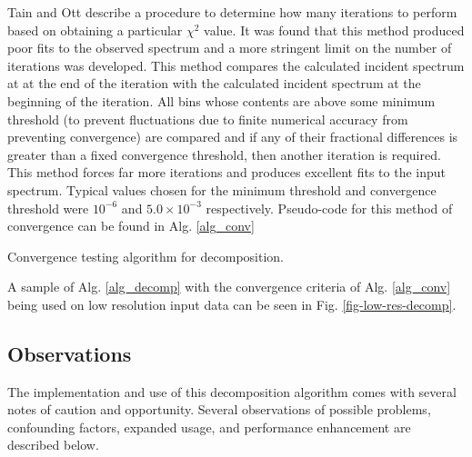 \documentclass[5p]{elsarticle}
\makeatletter
\def\BState{\State\hskip-\ALG@thistlm}
\DeclarePairedDelimiter{\abs}{\lvert}{\rvert}
\DeclarePairedDelimiter{\paren}{\lparen}{\rparen}
\makeatother
\begin{document}
Tain and Ott describe a procedure to determine how many iterations to perform based on obtaining a particular $\chi{}^2$ value. It was found that this method produced poor fits to the observed spectrum and a more stringent limit on the number of iterations was developed. This method compares the calculated incident spectrum at at the end of the iteration with the calculated incident spectrum at the beginning of the iteration. All bins whose contents are above some minimum threshold (to prevent fluctuations due to finite numerical accuracy from preventing convergence) are compared and if any of their fractional differences is greater than a fixed convergence threshold, then another iteration is required. This method forces far more iterations and produces excellent fits to the input spectrum. Typical values chosen for the minimum threshold and convergence threshold were $10^{-6}$ and $5.0\times{}10^{-3}$ respectively. Pseudo-code for this method of convergence can be found in Alg. \ref{alg_conv}

\begin{algorithm}[H]
\caption{Convergence testing algorithm for decomposition.}\label{alg_conv}
\end{algorithm}

A sample of Alg. \ref{alg_decomp} with the convergence criteria of Alg. \ref{alg_conv} being used on low resolution input data can be seen in Fig. \ref{fig-low-res-decomp}.

\subsection{Observations}
The implementation and use of this decomposition algorithm comes with several notes of caution and opportunity. Several observations of possible problems, confounding factors, expanded usage, and performance enhancement are described below.
\end{document}
